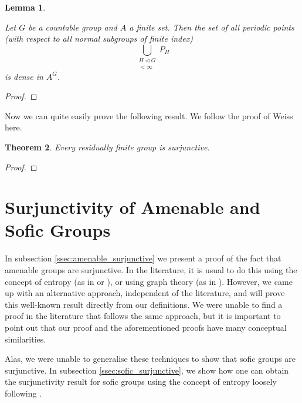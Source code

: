 \documentclass[titlepage, a4paper]{article}
\theoremstyle{theoremdd}
\newtheorem{theorem}{Theorem}[section]
\newtheorem{lemma}[theorem]{Lemma}
\theoremstyle{definition}
\theoremstyle{remark}
\begin{document}
\begin{lemma} \label{lem:h-periodic_points}
    
Let $G$ be a countable group and $A$ a finite set. Then the set of all periodic points (with respect to all normal subgroups of finite index)
    \[
    \bigcup_{\substack{ H \triangleleft G \\ [G : H] < \infty}} P_H
    \]
is dense in $A^G$.
\end{lemma}
\begin{proof}
% 

\end{proof}

Now we can quite easily prove the following result. We follow the proof of Weiss \cite[Theorem 1.3]{weiss_2000} here.
\begin{theorem} \label{thm:res_fin_surjunctive}
    Every residually finite group is surjunctive.
\end{theorem}
\begin{proof}
    
\end{proof}

	
\section{Surjunctivity of Amenable and Sofic Groups}

In subsection \ref{ssec:amenable_surjunctive} we present a proof of the fact that amenable groups are surjunctive. In the literature, it is usual to do this using the concept of entropy (as in \cite[section 4]{kerr_li_2010} or \cite[subsection 2.13]{capraro_lupini_2015}), or using graph theory (as in \cite[section 3]{weiss_2000}). However, we came up with an alternative approach, independent of the literature, and will prove this well-known result directly from our definitions. We were unable to find a proof in the literature that follows the same approach, but it is important to point out that our proof and the aforementioned proofs have many conceptual similarities. 

Alas, we were unable to generalise these techniques to show that sofic groups are surjunctive. In subsection \ref{ssec:sofic_surjunctive}, we show how one can obtain the surjunctivity result for sofic groups using the concept of entropy loosely following \cite[paragraph 2.13.6 - 2.13.7]{capraro_lupini_2015}.
\end{document}
